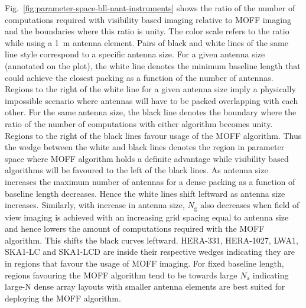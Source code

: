 \documentclass[a4paper,fleqn,usenatbib]{../mnras}
\begin{document}
Fig.~\ref{fig:parameter-space-bll-nant-instruments} shows the ratio of the
number of computations required with visibility based imaging relative to 
MOFF imaging and the boundaries where this ratio is unity. The color scale 
refers to the ratio while using a 1~m antenna element. Pairs of black and
white lines of the same line style correspond to a specific antenna size. For 
a given antenna size (annotated on the plot), the white line denotes the 
minimum baseline length that could achieve the closest packing as a function 
of the number of antennas. Regions to the right of the white line for a 
given antenna size imply a physically impossible scenario where antennas will 
have to be packed overlapping with each other. For the same antenna size, the 
black line denotes the boundary where the ratio of the number of computations 
with either algorithm becomes unity. Regions to the right of the black lines 
favour usage of the MOFF algorithm. Thus the wedge between the white and black 
lines denotes the region in parameter space where MOFF algorithm holds a 
definite advantage while visibility based algorithms will be favoured to the 
left of the black lines. As antenna size increases the maximum number of 
antennas for a dense packing as a function of baseline length decreases. Hence 
the white lines shift leftward as antenna size increases. Similarly, with 
increase in antenna size, $N_\textrm{g}$ also decreases when field of view 
imaging is achieved with an increasing grid spacing equal to antenna size and
hence lowers the amount of computations required with the MOFF algorithm. This
shifts the black curves leftward. HERA-331, HERA-1027, LWA1, SKA1-LC and 
SKA1-LCD are inside their respective wedges indicating they are in regions that
favour the usage of MOFF imaging. For fixed baseline length, regions favouring
the MOFF algorithm tend to be towards large $N_\textrm{a}$ indicating large-N
dense array layouts with smaller antenna elements are best suited for deploying 
the MOFF algorithm.
\end{document}
